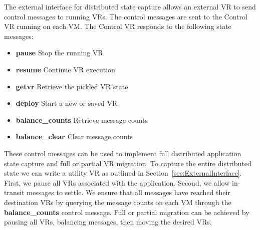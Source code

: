The external interface for distributed state capture allows an external VR to send control messages to running VRs.  The control messages are sent to the Control VR running on each VM.  The Control VR responds to the following state messages:

\begin{itemize}
\item {\bf pause} Stop the running VR
\item {\bf resume} Continue VR execution
\item {\bf getvr} Retrieve the pickled VR state
\item {\bf deploy} Start a new or saved VR
\item {\bf balance\_counts} Retrieve message counts
\item {\bf balance\_clear} Clear message counts
\end{itemize}

These control messages can be used to implement full distributed
application state capture and full or partial VR migration.  To capture the
entire distributed state we can write a utility VR as outlined in
Section~\ref{sec:ExternalInterface}.  First, we pause all VRs associated
with the application.  Second, we allow in-transit messages to settle.  We
ensure that all messages have reached their destination VRs by querying the
message counts on each VM through the {\bf balance\_counts} control
message.  Full or partial migration can be achieved by pausing all VRs,
balancing messages, then moving the desired VRs.

